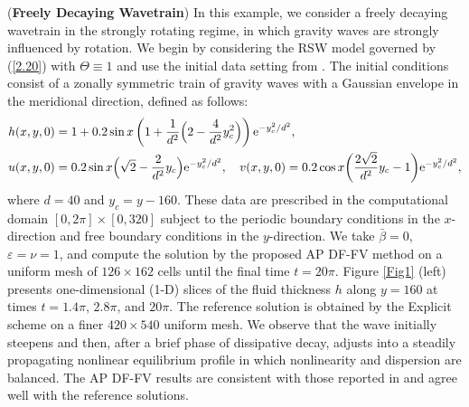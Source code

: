 \documentclass[a4paper,11pt,twoside]{article}
\numberwithin{equation}{section}
\numberwithin{figure}{section}
\numberwithin{table}{section}
\newcommand{\eps}{\varepsilon}
\newcommand\eref[1]{(\ref{#1})}
\begin{document}
\begin{example}({\bf Freely Decaying Wavetrain}) 
In this example, we consider a freely decaying wavetrain in the strongly rotating regime, in which gravity waves are strongly influenced by 
rotation. We begin by considering the RSW model governed by \eref{2.20} with $\Theta\equiv1$ and use the initial data setting from
\cite[Example 5.2]{Buhler_2000}. The initial conditions consist of a zonally symmetric train of gravity waves with a Gaussian envelope in
the meridional direction, defined as follows:
\begin{equation}
\begin{aligned}
&h(x,y,0)=1+0.2\sin x\left(1+\frac{1}{d^2}\Big(2-\frac{4}{d^2}y_c^2\Big)\right){\rm e}^{-y_c^2/d^2},\\
&u(x,y,0)=0.2\sin x\Big(\sqrt{2}-\frac{2}{d^2}y_c\Big){\rm e}^{-y_c^2/d^2},\quad
v(x,y,0)=0.2\cos x\bigg(\frac{2\sqrt{2}}{d^2}y_c-1\bigg){\rm e}^{-y_c^2/d^2},
\end{aligned}
\label{5.1}
\end{equation}
where $d=40$ and $y_c=y-160$. These data are prescribed in the computational domain $[0,2\pi]\times[0,320]$ subject to the periodic boundary
conditions in the $x$-direction and free boundary conditions in the $y$-direction. We take $\bar\beta=0$, $\eps=\nu=1$, and compute the
solution by the proposed AP DF-FV method on a uniform mesh of $126\times162$ cells until the final time $t=20\pi$. Figure \ref{Fig1} (left)
presents one-dimensional (1-D) slices of the fluid thickness $h$ along $y=160$ at times $t=1.4\pi$, $2.8\pi$, and $20\pi$. The reference
solution is obtained by the Explicit scheme on a finer $420\times540$ uniform mesh. We observe that the wave initially steepens and then,
after a brief phase of dissipative decay, adjusts into a steadily propagating nonlinear equilibrium profile in which nonlinearity and
dispersion are balanced. The AP DF-FV results are consistent with those reported in \cite{Buhler_2000} and agree well with the reference
solutions. 
	

\end{example}
\end{document}
